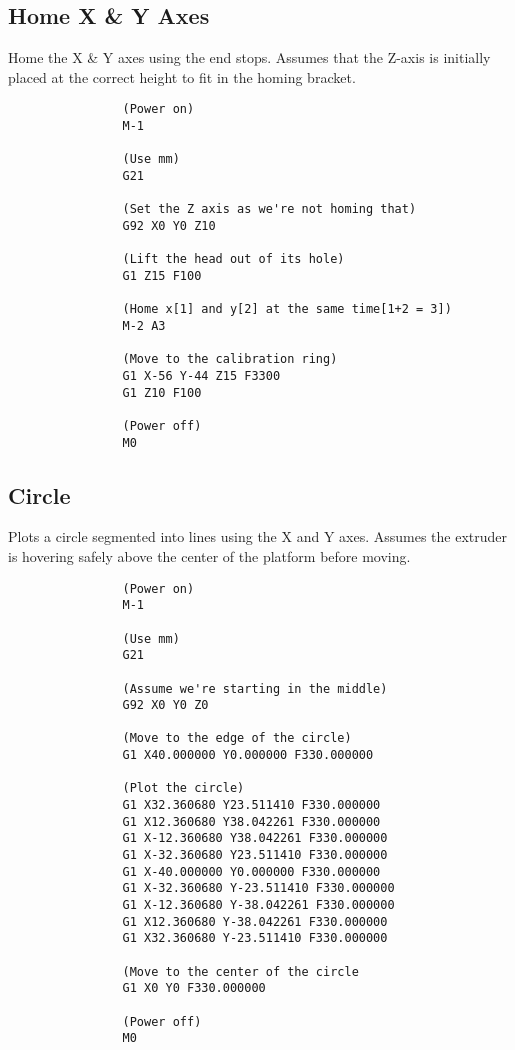 		\subsection{Home X \& Y Axes}
			
			Home the X \& Y axes using the end stops. Assumes that the Z-axis is
			initially placed at the correct height to fit in the homing bracket.
			
			\begin{verbatim}
				(Power on)
				M-1
				
				(Use mm)
				G21
				
				(Set the Z axis as we're not homing that)
				G92 X0 Y0 Z10
				
				(Lift the head out of its hole)
				G1 Z15 F100
				
				(Home x[1] and y[2] at the same time[1+2 = 3])
				M-2 A3
				
				(Move to the calibration ring)
				G1 X-56 Y-44 Z15 F3300
				G1 Z10 F100
				
				(Power off)
				M0
			\end{verbatim}
			
			\label{sec:gcode_home_xy}
		
		\subsection{Circle}
			
			Plots a circle segmented into lines using the X and Y axes. Assumes the
			extruder is hovering safely above the center of the platform before
			moving.
			
			\begin{verbatim}
				(Power on)
				M-1
				
				(Use mm)
				G21
				
				(Assume we're starting in the middle)
				G92 X0 Y0 Z0
				
				(Move to the edge of the circle)
				G1 X40.000000 Y0.000000 F330.000000
				
				(Plot the circle)
				G1 X32.360680 Y23.511410 F330.000000
				G1 X12.360680 Y38.042261 F330.000000
				G1 X-12.360680 Y38.042261 F330.000000
				G1 X-32.360680 Y23.511410 F330.000000
				G1 X-40.000000 Y0.000000 F330.000000
				G1 X-32.360680 Y-23.511410 F330.000000
				G1 X-12.360680 Y-38.042261 F330.000000
				G1 X12.360680 Y-38.042261 F330.000000
				G1 X32.360680 Y-23.511410 F330.000000
				
				(Move to the center of the circle
				G1 X0 Y0 F330.000000
				
				(Power off)
				M0
			\end{verbatim}
